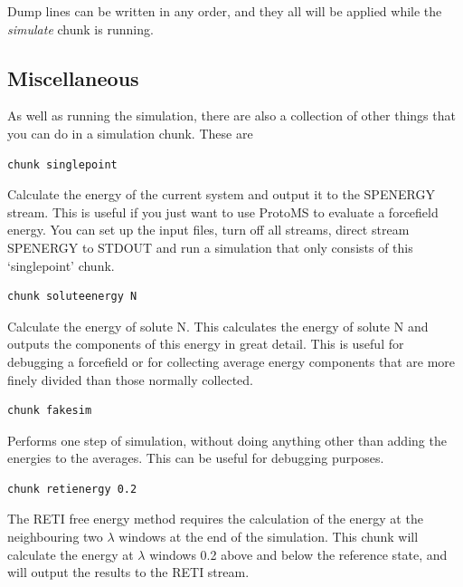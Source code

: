 \documentclass[letterpaper,10pt,english]{sphinxmanual}
\begin{document}
Dump lines can be written in any order, and they all will be applied while the \emph{simulate} chunk is running.


\subsection{Miscellaneous}
\label{protoms:miscellaneous}\label{protoms:misccmd}
As well as running the simulation, there are also a collection of other things that you can do in a simulation chunk. These are

\begin{Verbatim}[commandchars=\\\{\}]
chunk singlepoint
\end{Verbatim}

Calculate the energy of the current system and output it to the SPENERGY stream. This is useful if you just want to use ProtoMS to evaluate a forcefield energy. You can set up the input files, turn off all streams, direct stream SPENERGY to STDOUT and run a simulation that only consists of this ‘singlepoint’ chunk.

\begin{Verbatim}[commandchars=\\\{\}]
chunk soluteenergy N
\end{Verbatim}

Calculate the energy of solute N. This calculates the energy of solute N and outputs the components of this energy in great detail. This is useful for debugging a forcefield or for collecting average energy components that are more finely divided than those normally collected.

\begin{Verbatim}[commandchars=\\\{\}]
chunk fakesim
\end{Verbatim}

Performs one step of simulation, without doing anything other than adding the energies to the averages. This can be useful for debugging purposes.

\begin{Verbatim}[commandchars=\\\{\}]
chunk retienergy 0.2
\end{Verbatim}

The RETI free energy method requires the calculation of the energy at the neighbouring two \(\lambda\) windows at the end of the simulation. This chunk will calculate the energy at \(\lambda\) windows 0.2 above and below the reference state, and will output the results to the RETI stream.
\end{document}

